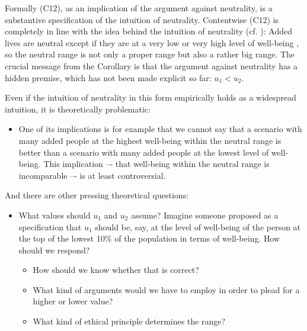Formally (C12), as an implication of the argument against neutrality, is a substantive specification of the intuition of neutrality. Contentwise (C12) is completely in line with the idea behind the intuition of neutrality (cf. ): Added lives are neutral except if they are at a very low or very high level of well-being \cite[p.~172]{broome_2012}, so the neutral range is not only a proper range but also a rather big range. The crucial message from the Corollary is that the argument against neutrality has a hidden premise, which has not been made explicit so far: $u_1 < u_2$.

Even if the intuition of neutrality in this form empirically holds as a widespread intuition, it is theoretically problematic:
\begin{itemize}
\item One of its implications is for example that we cannot say that a scenario with many added people at the highest well-being within the neutral range is better than a scenario with many added people at the lowest level of well-being. This implication –- that well-being within the neutral range is incomparable –- is at least controversial. 
\end{itemize}
And there are other pressing theoretical questions: 
\begin{itemize}
\item What values should $u_1$ and $u_2$ assume? Imagine someone proposed as a specification that $u_1$ should be, say, at the level of well-being of the person at the top of the lowest 10\% of the population in terms of well-being. How should we respond? 
\begin{itemize}
\item How should we know whether that is correct?
\item What kind of arguments would we have to employ in order to plead for a higher or lower value?
\item What kind of ethical principle determines the range? 
\end{itemize}
\end{itemize}

